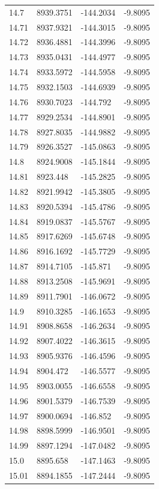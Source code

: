 \begin{table}[H]
\begin{tabular}{llll}
14.7 & 8939.3751 & -144.2034 & -9.8095 \\
14.71 & 8937.9321 & -144.3015 & -9.8095 \\
14.72 & 8936.4881 & -144.3996 & -9.8095 \\
14.73 & 8935.0431 & -144.4977 & -9.8095 \\
14.74 & 8933.5972 & -144.5958 & -9.8095 \\
14.75 & 8932.1503 & -144.6939 & -9.8095 \\
14.76 & 8930.7023 & -144.792 & -9.8095 \\
14.77 & 8929.2534 & -144.8901 & -9.8095 \\
14.78 & 8927.8035 & -144.9882 & -9.8095 \\
14.79 & 8926.3527 & -145.0863 & -9.8095 \\
14.8 & 8924.9008 & -145.1844 & -9.8095 \\
14.81 & 8923.448 & -145.2825 & -9.8095 \\
14.82 & 8921.9942 & -145.3805 & -9.8095 \\
14.83 & 8920.5394 & -145.4786 & -9.8095 \\
14.84 & 8919.0837 & -145.5767 & -9.8095 \\
14.85 & 8917.6269 & -145.6748 & -9.8095 \\
14.86 & 8916.1692 & -145.7729 & -9.8095 \\
14.87 & 8914.7105 & -145.871 & -9.8095 \\
14.88 & 8913.2508 & -145.9691 & -9.8095 \\
14.89 & 8911.7901 & -146.0672 & -9.8095 \\
14.9 & 8910.3285 & -146.1653 & -9.8095 \\
14.91 & 8908.8658 & -146.2634 & -9.8095 \\
14.92 & 8907.4022 & -146.3615 & -9.8095 \\
14.93 & 8905.9376 & -146.4596 & -9.8095 \\
14.94 & 8904.472 & -146.5577 & -9.8095 \\
14.95 & 8903.0055 & -146.6558 & -9.8095 \\
14.96 & 8901.5379 & -146.7539 & -9.8095 \\
14.97 & 8900.0694 & -146.852 & -9.8095 \\
14.98 & 8898.5999 & -146.9501 & -9.8095 \\
14.99 & 8897.1294 & -147.0482 & -9.8095 \\
15.0 & 8895.658 & -147.1463 & -9.8095 \\
15.01 & 8894.1855 & -147.2444 & -9.8095 \\

\end{tabular}
\end{table}
